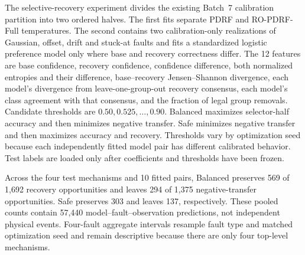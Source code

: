 \documentclass[10pt]{article}
\begin{document}
\begin{table}[ht]
\centering
\caption{Strict fault-applied-and-available effects under the fixed Gaussian intervention. Values are paired across 10 optimization seeds.}
\resizebox{0.76\textwidth}{!}{}
\end{table}

The selective-recovery experiment divides the existing Batch~7 calibration partition into two ordered halves. The first fits separate PDRF and RO-PDRF-Full temperatures. The second contains two calibration-only realizations of Gaussian, offset, drift and stuck-at faults and fits a standardized logistic preference model only where base and recovery correctness differ. The 12 features are base confidence, recovery confidence, confidence difference, both normalized entropies and their difference, base--recovery Jensen--Shannon divergence, each model's divergence from leave-one-group-out recovery consensus, each model's class agreement with that consensus, and the fraction of legal group removals. Candidate thresholds are $0.50,0.525,\ldots,0.90$. Balanced maximizes selector-half accuracy and then minimizes negative transfer. Safe minimizes negative transfer and then maximizes accuracy and recovery. Thresholds vary by optimization seed because each independently fitted model pair has different calibrated behavior. Test labels are loaded only after coefficients and thresholds have been frozen.

Across the four test mechanisms and 10 fitted pairs, Balanced preserves 569 of 1,692 recovery opportunities and leaves 294 of 1,375 negative-transfer opportunities. Safe preserves 303 and leaves 137, respectively. These pooled counts contain 57,440 model--fault--observation predictions, not independent physical events. Four-fault aggregate intervals resample fault type and matched optimization seed and remain descriptive because there are only four top-level mechanisms.

\begin{table}[ht]
\centering
\caption{Selective-recovery strict-subset macro-AUROC. Values are means $\pm$ standard deviations across 10 optimization seeds.}
\resizebox{0.94\textwidth}{!}{}
\end{table}

\begin{table}[ht]
\centering
\caption{Recovery-oriented modern-baseline audit on the strict subset. RO-MER contains group experts and one joint expert with sample-dependent routing.}
\resizebox{0.80\textwidth}{!}{}
\end{table}
\end{document}
